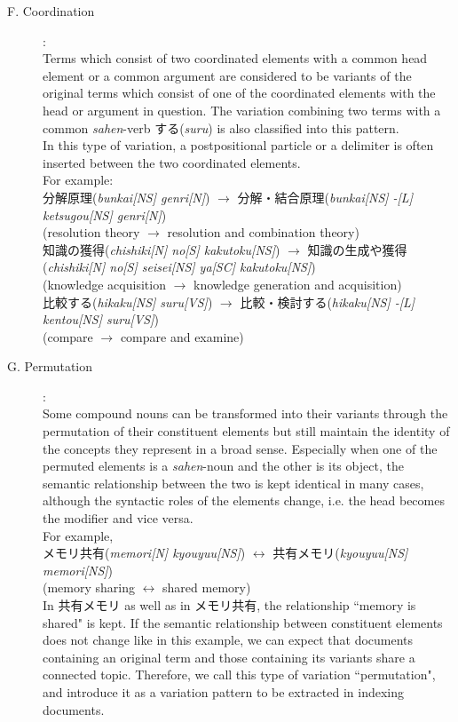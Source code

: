 \begin{description}
\item[F. Coordination]:\\
Terms which consist of two coordinated elements with a common head element or a common argument are considered to be variants of the original terms which consist of one of the coordinated elements with the head or argument in question. The variation combining two terms with a common {\it sahen}-verb する({\it suru}) is also classified into this pattern.\\
In this type of variation, a postpositional particle or a delimiter is often inserted between the two coordinated elements.\\
For example:\\
分解原理({\it bunkai[NS] genri[N]}) $\rightarrow$ 分解・結合原理({\it bunkai[NS] -[L] ketsugou[NS] genri[N]})\\
(resolution theory $\rightarrow$ resolution and combination theory)\\
知識の獲得({\it chishiki[N] no[S] kakutoku[NS]}) $\rightarrow$ 知識の生成や獲得({\it chishiki[N] no[S] seisei[NS] ya[SC] kakutoku[NS]})\\
(knowledge acquisition $\rightarrow$ knowledge generation and acquisition)\\
比較する({\it hikaku[NS] suru[VS]}) $\rightarrow$ 比較・検討する({\it hikaku[NS] -[L] kentou[NS] suru[VS]})\\
(compare $\rightarrow$ compare and examine)\\

\item[G. Permutation]:\\
Some compound nouns can be transformed into their variants through the permutation of their constituent elements but still maintain the identity of the concepts they represent in a broad sense. Especially when one of the permuted elements is a {\it sahen}-noun and the other is its object, the semantic relationship between the two is kept identical in many cases, although the syntactic roles of the elements change, i.e. the head becomes the modifier and vice versa.\\
For example,\\
メモリ共有({\it memori[N] kyouyuu[NS]}) $\leftrightarrow$ 共有メモリ({\it kyouyuu[NS] memori[NS]})\\
(memory sharing $\leftrightarrow$ shared memory)\\

In 共有メモリ as well as in メモリ共有, the relationship ``memory is shared" is kept. If the semantic relationship between constituent elements does not change like in this example, we can expect that documents containing an original term and those containing its variants share a connected topic. Therefore, we call this type of variation ``permutation", and introduce it as a variation pattern to be extracted in indexing documents.
\end{description}

